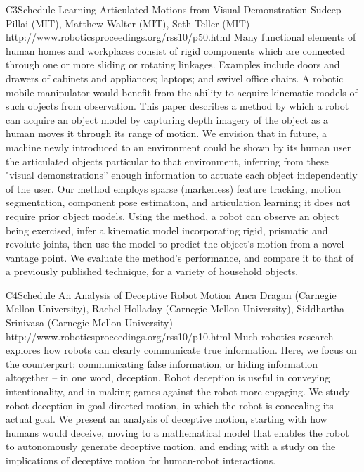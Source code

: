 \begin{spacing}{1.0}
\descriptionPaper
{C3}{Schedule}
{	
Learning Articulated Motions from Visual Demonstration
}
{
Sudeep Pillai (MIT), Matthew Walter (MIT), Seth Teller (MIT)
}
{
http://www.roboticsproceedings.org/rss10/p50.html
}
{
Many functional elements of human homes and workplaces consist of rigid components which are connected through one or more sliding or rotating linkages. Examples include doors and drawers of cabinets and appliances; laptops; and swivel office chairs. A robotic mobile manipulator would benefit from the ability to acquire kinematic models of such objects from observation. This paper describes a method by which a robot can acquire an object model by capturing depth imagery of the object as a human moves it through its range of motion. We envision that in future, a machine newly introduced to an environment could be shown by its human user the articulated objects particular to that environment, inferring from these "visual demonstrations'' enough information to actuate each object independently of the user. Our method employs sparse (markerless) feature tracking, motion segmentation, component pose estimation, and articulation learning; it does not require prior object models. Using the method, a robot can observe an object being exercised, infer a kinematic model incorporating rigid, prismatic and revolute joints, then use the model to predict the object's motion from a novel vantage point. We evaluate the method's performance, and compare it to that of a previously published technique, for a variety of household objects.
}


\descriptionPaper
{C4}{Schedule}
{	
An Analysis of Deceptive Robot Motion
}
{
Anca Dragan (Carnegie Mellon University), Rachel Holladay (Carnegie Mellon University), Siddhartha Srinivasa (Carnegie Mellon University)
}
{
http://www.roboticsproceedings.org/rss10/p10.html
}
{
Much robotics research explores how robots can clearly communicate true information. Here, we focus on the counterpart: communicating false information, or hiding information altogether -- in one word, deception. Robot deception is useful in conveying intentionality, and in making games against the robot more engaging. We study robot deception in goal-directed motion, in which the robot is concealing its actual goal. We present an analysis of deceptive motion, starting with how humans would deceive, moving to a mathematical model that enables the robot to autonomously generate deceptive motion, and ending with a study on the implications of deceptive motion for human-robot interactions.
}




\end{spacing}
